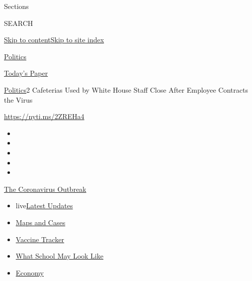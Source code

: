 Sections

SEARCH

\protect\hyperlink{site-content}{Skip to
content}\protect\hyperlink{site-index}{Skip to site index}

\href{https://www.nytimes.com/section/politics}{Politics}

\href{https://myaccount.nytimes.com/auth/login?response_type=cookie\&client_id=vi}{}

\href{https://www.nytimes.com/section/todayspaper}{Today's Paper}

\href{/section/politics}{Politics}\textbar{}2 Cafeterias Used by White
House Staff Close After Employee Contracts the Virus

\url{https://nyti.ms/2ZREHa4}

\begin{itemize}
\item
\item
\item
\item
\item
\end{itemize}

\href{https://www.nytimes.com/news-event/coronavirus?action=click\&pgtype=Article\&state=default\&region=TOP_BANNER\&context=storylines_menu}{The
Coronavirus Outbreak}

\begin{itemize}
\tightlist
\item
  live\href{https://www.nytimes.com/2020/08/01/world/coronavirus-covid-19.html?action=click\&pgtype=Article\&state=default\&region=TOP_BANNER\&context=storylines_menu}{Latest
  Updates}
\item
  \href{https://www.nytimes.com/interactive/2020/us/coronavirus-us-cases.html?action=click\&pgtype=Article\&state=default\&region=TOP_BANNER\&context=storylines_menu}{Maps
  and Cases}
\item
  \href{https://www.nytimes.com/interactive/2020/science/coronavirus-vaccine-tracker.html?action=click\&pgtype=Article\&state=default\&region=TOP_BANNER\&context=storylines_menu}{Vaccine
  Tracker}
\item
  \href{https://www.nytimes.com/interactive/2020/07/29/us/schools-reopening-coronavirus.html?action=click\&pgtype=Article\&state=default\&region=TOP_BANNER\&context=storylines_menu}{What
  School May Look Like}
\item
  \href{https://www.nytimes.com/live/2020/07/31/business/stock-market-today-coronavirus?action=click\&pgtype=Article\&state=default\&region=TOP_BANNER\&context=storylines_menu}{Economy}
\end{itemize}

